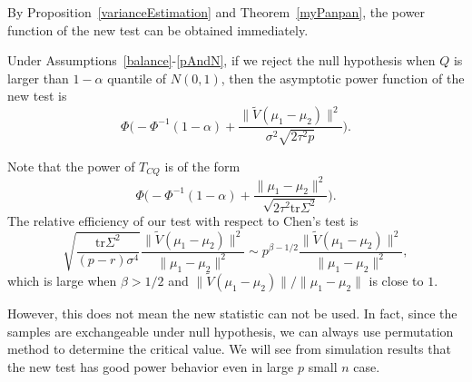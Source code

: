 
By Proposition~\ref{varianceEstimation}  and Theorem~\ref{myPanpan}, the power function of the new test can be obtained immediately.


\begin{corollary}\label{testPowerh}
    Under Assumptions~\ref{balance}-\ref{pAndN},
    if we reject the null hypothesis when $Q$ is larger than $1-\alpha$ quantile of $N(0,1)$, then the asymptotic power function of the new test is
    \begin{equation*}
        \Phi\Big(-\Phi^{-1}(1-\alpha)+\frac{\|\tilde{V}(\mu_1-\mu_2)\|^2}{\sigma^2\sqrt{2\tau^2p}}\Big).
    \end{equation*}
\end{corollary}


 Note that the power of $T_{CQ}$ is of the form
\begin{equation*}
    \Phi\Big(-\Phi^{-1}(1-\alpha)+\frac{\|\mu_1-\mu_2\|^2}{\sqrt{2\tau^2\mathrm{tr}\Sigma^2}}\Big).
\end{equation*}
 The relative efficiency of our test with respect to Chen's test is
\begin{equation*}
    \sqrt{\frac{\mathrm{tr}\Sigma^2}{(p-r)\sigma^4}}\frac{\|\tilde{V}(\mu_1-\mu_2)\|^2}{\|\mu_1-\mu_2\|^2}\sim p^{\beta-1/2}\frac{\|\tilde{V}(\mu_1-\mu_2)\|^2}{\|\mu_1-\mu_2\|^2},
\end{equation*}
which is large when $\beta>1/2$ and $\|\tilde{V}(\mu_1-\mu_2)\|/\|\mu_1-\mu_2\|$ is close to $1$.


However, this does not mean the new statistic can not be used.
In fact, since the samples are exchangeable under null hypothesis, we can always use permutation method to determine the critical value.
We will see from simulation results that the new test has good power behavior even in large $p$ small $n$ case.




